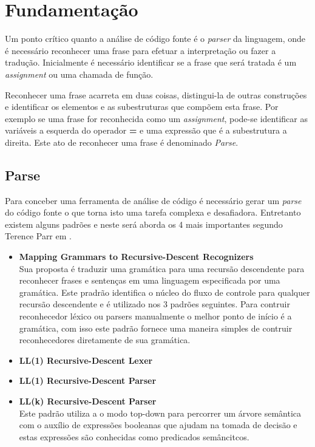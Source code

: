 %
%
\chapter{Fundamentação}
Um ponto crítico quanto a análise de código fonte é o \textit{parser} da linguagem, onde é necessário reconhecer uma frase para efetuar a interpretação ou fazer a tradução. Inicialmente é necessário identificar se a frase que será tratada é um \textit{assignment} ou uma chamada de função.
 
Reconhecer uma frase acarreta em duas coisas, distingui-la de outras construções e identificar os elementos e as subestruturas que compõem esta frase. Por exemplo se uma frase for reconhecida como um \textit{assignment}, pode-se identificar as variáveis a esquerda do operador \textbf{=} e uma expressão que é a subestrutura a direita. Este ato de reconhecer uma frase é denominado \textit{Parse}.

\section{Parse}

Para conceber uma ferramenta de análise de código é necessário gerar um \textit{parse} do código fonte o que torna isto uma tarefa complexa e desafiadora. Entretanto existem alguns padrões e neste será aborda os 4 mais importantes segundo Terence Parr em \cite{Parr:2009:LIP:1823613}.
\begin{itemize}
	\item \textbf{Mapping Grammars to Recursive-Descent Recognizers}\\
	Sua proposta é traduzir uma gramática para uma recursão descendente para reconhecer frases e sentenças em uma linguagem especificada por uma gramática. Este pradrão identifica o núcleo do fluxo de controle para qualquer recursão descendente e é utilizado nos 3 padrões seguintes. 
	Para contruir reconhecedor léxico ou parsers manualmente o melhor ponto de início é a gramática, com isso este padrão fornece uma maneira simples de contruir reconhecedores diretamente de sua gramática.
	
	\item \textbf{LL(1) Recursive-Descent Lexer}\\
	
	\item \textbf{LL(1) Recursive-Descent Parser}\\
	
	\item \textbf{LL(k) Recursive-Descent Parser}\\
	Este padrão utiliza a o modo top-down para percorrer um árvore semântica com o auxílio de expressões booleanas que ajudam na tomada de decisão e estas expressões são conhecidas como predicados semâncitcos.
	
\end{itemize}


